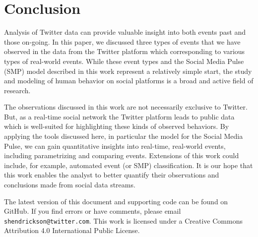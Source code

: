\documentclass{article}
\begin{document}
\section{Conclusion} 
\label{sec:conclusion}

Analysis of Twitter data can provide valuable insight into both events past and those on-going. In this paper, we discussed three types of events that we have observed in the data from the Twitter platform which corresponding to various types of real-world events. While these event types and the Social Media Pulse (SMP) model described in this work represent a relatively simple start, the study and modeling of human behavior on social platforms is a broad and active field of research. 

The observations discussed in this work are not necessarily exclusive to Twitter. But, as a real-time social network the Twitter platform leads to public data which is well-suited for highlighting these kinds of observed behaviors. By applying the tools discussed here, in particular the model for the Social Media Pulse, we can gain quantitative insights into real-time, real-world events, including parametrizing and comparing events. Extensions of this work could include, for example, automated event (or SMP) classification. It is our hope that this work enables the analyst to better quantify their observations and conclusions made from social data streams. 

The latest version of this document and supporting code can be found on GitHub.\cite{pulse} If you find errors or have comments, please email \texttt{shendrickson@twitter.com}. This work is licensed under a Creative Commons Attribution 4.0 International Public License.\cite{CreativeCommons}


      
 

\end{document}
